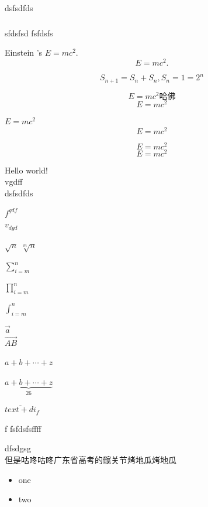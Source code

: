 \paragraph{} 
dsfsdfds
\subparagraph{} 
sfdsfsd
fsfdsfs

Einstein 's $E=mc^2$.   %
\[ E=mc^2. \]   %

\begin{displaymath} 
S_{n+1} = S_{n} + S_{n},  
S_{n}=1=2^{n} 
\end{displaymath}


\begin{equation} 
E=mc^2 
\textbf{哈佛}
\end{equation}
\begin{equation} 
E=mc^2 
\end{equation}


$E=mc^2$ 
$$E=mc^2$$

\begin{equation} 
E=mc^2 
\end{equation}
\begin{equation} 
E=mc^2 
\end{equation}


Hello world! \\
vgdff \\
dsfsdfds

$f^{gdf}$ \\
$v_{dgd}$

$\sqrt{n}$
$\sqrt[m]{n}$

$\sum_{i=m}^{n}$

$\prod_{i=m}^{n}$


$\int_{i=m}^n$


$\vec {a}$\\
$\overrightarrow{AB}$

$a+b+\cdots+z$

$\underbrace{a+b+\cdots+z}_{26}$

$\overline{text+di}_{f}$

{f}
fsfdsfsffff

dfsdgsg\\

但是咕咚咕咚广东省高考的髋关节烤地瓜烤地瓜\\

\begin{itemize}
	\item one
	\item two
\end{itemize}

